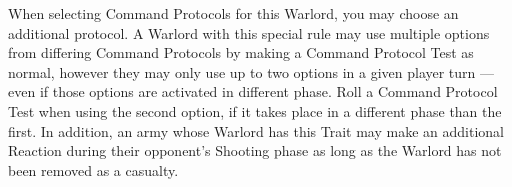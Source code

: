 \begin{multicols}{2}
	When selecting Command Protocols for this Warlord, you may choose an additional protocol. A Warlord with this special rule may use multiple options from differing Command Protocols by making a Command Protocol Test as normal, however they may only use up to two options in a given player turn — even if those options are activated in different phase. Roll a Command Protocol Test when using the second option, if it takes place in a different phase than the first. In addition, an army whose Warlord has this Trait may make an additional Reaction during their opponent’s Shooting phase as long as the Warlord has not been removed as a casualty.
\end{multicols}
